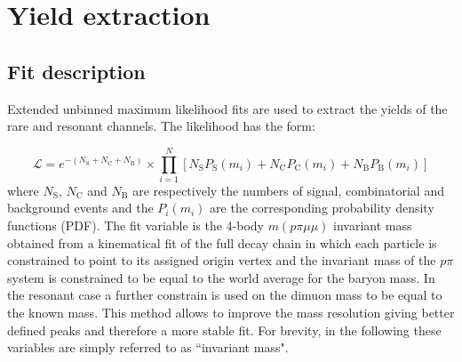 \chapter{Yield extraction}

\section{Fit description}
\label{sec:Lb_fit}

Extended unbinned maximum likelihood fits are used to extract the yields of the rare and resonant channels.
The likelihood has the form:

\begin{equation}
\mathcal{L}=e^{-(N_\mathrm{S}+N_\mathrm{C}+N_{\mathrm{B}})}\times\prod_{i=1}^{N}\left[
N_\mathrm{S}P_{\mathrm{S}}(m_i)+N_\mathrm{C}P_\mathrm{C}(m_i)+N_{\mathrm{B}}P_{\mathrm{B}}(m_i)\right]
\end{equation}
\noindent
where $N_\mathrm{S}$, $N_\mathrm{C}$ and $N_\mathrm{B}$ are respectively the numbers of signal, 
combinatorial and \KS background events and the $P_i(m_i)$ are the corresponding probability density functions (PDF).
The fit variable is the 4-body $m(p\pi\mu\mu)$ invariant mass obtained from
a kinematical fit of the full decay chain in which each particle is constrained to point to its
assigned origin vertex and the invariant mass of the $p\pi$ system is constrained to be equal to
the world average for the \Lz baryon mass. In the resonant case a further constrain is used on the dimuon
mass to be equal to the known \jpsi mass. This method allows to improve the mass resolution giving
better defined peaks and therefore a more stable fit. For brevity, in the following these variables are
simply referred to as ``invariant mass".

